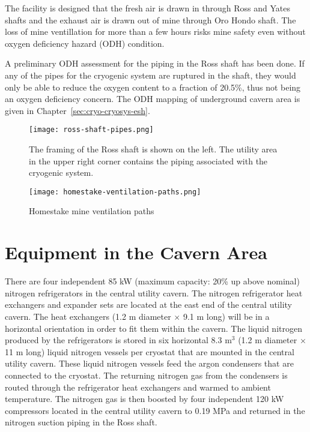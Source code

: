 The facility is designed that the fresh air is drawn
in through Ross and Yates shafts
and the exhaust
air is drawn out of mine through Oro Hondo shaft.
The loss of mine ventillation for more than a few hours risks mine safety
even without oxygen deficiency hazard (ODH) condition.

A preliminary ODH assessment for 
the piping in the Ross shaft has been done. If any of the pipes
for the cryogenic system are ruptured in the shaft, they would
only be able to reduce the oxygen content to a fraction of 20.5\%, 
thus not being an oxygen deficiency concern. The ODH mapping
of underground cavern area is given in Chapter~\ref{sec:cryo-cryosys-esh}.

\begin{figure}[htbp]
\centering
\texttt{[image: ross-shaft-pipes.png]} 
\caption{The framing of the Ross shaft is shown on the left. The utility area in the upper
right corner contains the piping
associated with the cryogenic system.}
\label{fig:framing-at-ross-piping}
\end{figure}

\begin{figure}[htbp]
\centering
\texttt{[image: homestake-ventilation-paths.png]} 
\caption{Homestake mine ventilation paths}
\label{fig:ventilation-paths}
\end{figure}

\chapter{Equipment in the Cavern Area}
\label{sec:cryo-cryosys-equip-cavern}

There are four independent 85 kW (maximum capacity: 20\% up above nominal) 
nitrogen refrigerators in the central utility cavern. The nitrogen
refrigerator heat exchangers and expander sets are located 
at the east end of the central utility cavern.
The heat exchangers (1.2 m diameter $\times$ 9.1 m long) 
will be in a horizontal orientation in order to
fit them within the cavern. The liquid nitrogen produced 
by the refrigerators is stored in six horizontal 
8.3 m$^3$ (1.2 m diameter $\times$ 11 m long) liquid 
nitrogen vessels per cryostat that are mounted in the
central utility cavern. These liquid nitrogen vessels
feed the argon condensers that are connected 
to the cryostat. The returning nitrogen gas from the 
condensers is routed through the refrigerator heat 
exchangers and warmed to ambient temperature. The 
nitrogen gas is then boosted by four independent 120 kW 
compressors located in the central utility cavern to 0.19 MPa 
and returned in the nitrogen suction piping 
in the Ross shaft.

